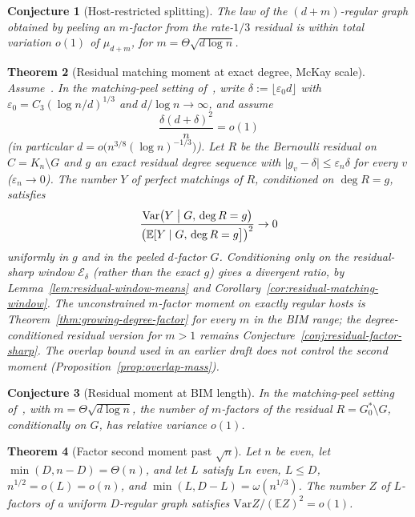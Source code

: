 \documentclass[11pt]{article}
\newtheorem{theorem}{Theorem}
\newtheorem{conjecture}[theorem]{Conjecture}
\newcommand{\EE}{\mathbb{E}}
\newcommand{\Var}{\mathrm{Var}}
\begin{document}
\begin{conjecture}[Host-restricted splitting]
\label{conj:config-split}
The law of the \((d+m)\)-regular graph obtained by peeling an \(m\)-factor from
the rate-\(1/3\) residual is within total variation \(o(1)\) of \(\mu_{d+m}\),
for \(m=\Theta\sqrt{d\log n}\).
\end{conjecture}

\begin{theorem}[Residual matching moment at exact degree, McKay scale]
\label{thm:residual-moment}
Assume~\cite[Theorem~4.6]{McK85}. In the matching-peel setting
of~\cite{PlusOneV1}, write \(\delta:=\lfloor\varepsilon_0 d\rfloor\) with
\(\varepsilon_0=C_3(\log n/d)^{1/3}\) and \(d/\log n\to\infty\), and assume
\[
\frac{\delta(d+\delta)^2}{n}=o(1)
\]
(in particular \(d=o\bigl(n^{3/8}(\log n)^{-1/3}\bigr)\)).
Let \(R\) be the Bernoulli residual on \(C=K_n\setminus G\) and \(g\) an exact
residual degree sequence with \(\lvert g_v-\delta\rvert\le\varepsilon_n\delta\) for every \(v\)
(\(\varepsilon_n\to0\)). The number \(Y\) of perfect matchings of \(R\), \emph{conditioned on}
\(\deg R=g\), satisfies
\[
\frac{\Var\bigl(Y\bigm|G,\,\deg R=g\bigr)}
{\bigl(\EE[Y\mid G,\,\deg R=g\bigr]\bigr)^2}
\to0
\]
uniformly in \(g\) and in the peeled \(d\)-factor \(G\). Conditioning only on the residual-sharp
window \(\mathcal E_\delta\) (rather than the exact \(g\)) gives a \emph{divergent} ratio, by
Lemma~\ref{lem:residual-window-means} and Corollary~\ref{cor:residual-matching-window}.
The unconstrained \(m\)-factor moment on exactly regular hosts is
Theorem~\ref{thm:growing-degree-factor} for every \(m\) in the BIM range;
the degree-conditioned residual version for \(m>1\) remains
Conjecture~\ref{conj:residual-factor-sharp}. The overlap bound used in an
earlier draft does not control the second moment
(Proposition~\ref{prop:overlap-mass}).
\end{theorem}

\begin{conjecture}[Residual moment at BIM length]
\label{conj:residual-moment-bim}
In the matching-peel setting of~\cite{PlusOneV1}, with
\(m=\Theta\sqrt{d\log n}\), the number of \(m\)-factors of the residual
\(R=G^*_0\setminus G\), conditionally on \(G\), has relative variance \(o(1)\).
\end{conjecture}

\begin{theorem}[Factor second moment past \(\sqrt{n}\)]
\label{thm:factor-moment}
\label{conj:factor-moment}
Let \(n\) be even, let \(\min(D,n-D)=\Theta(n)\), and let \(L\) satisfy \(Ln\) even,
\(L\le D\), \(n^{1/2}=o(L)=o(n)\), and \(\min(L,D-L)=\omega(n^{1/3})\).
The number \(Z\) of \(L\)-factors of a uniform \(D\)-regular graph satisfies
\(\Var Z/(\EE Z)^2=o(1)\).
\end{theorem}
\end{document}
